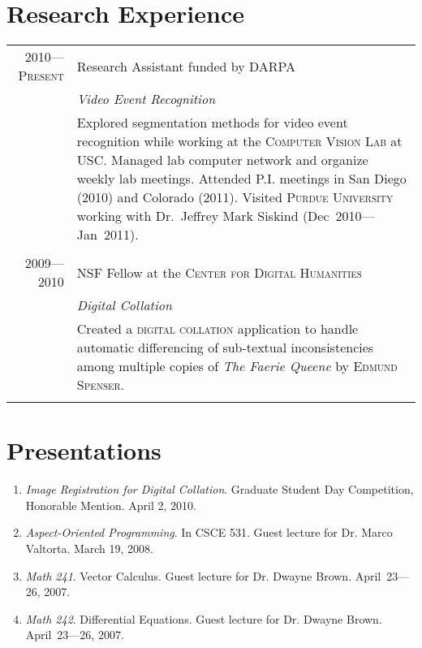 \documentclass[a4paper,10pt]{article}
\begin{document}
\section{Research Experience}
\begin{tabular}{r|p{11cm}}
\textsc{2010---Present}
& Research Assistant funded by \textsc{DARPA} \\
&\emph{Video Event Recognition}\\
&\footnotesize{Explored segmentation methods for video event recognition while working at the \textsc{Computer Vision Lab} at \textsc{USC}. Managed lab computer network and organize weekly lab meetings.  Attended P.I. meetings in San Diego (2010) and Colorado (2011). Visited \textsc{Purdue University} working with Dr.~Jeffrey Mark Siskind (Dec~2010---Jan~2011).}
\\\multicolumn{2}{c}{} \\
\textsc{2009---2010}
& NSF Fellow at the \textsc{Center for Digital Humanities} \\
&\emph{Digital Collation}\\
&\footnotesize{Created a \textsc{digital collation} application to handle automatic differencing of sub-textual inconsistencies among multiple copies of \emph{The Faerie Queene} by \textsc{Edmund Spenser}.}
\\\multicolumn{2}{c}{} \\
\end{tabular}


\nocite{temlyakov2010}
\nocite{zhang2010}
\renewcommand\refname{Publications}




\section{Presentations}
\begin{enumerate}
\renewcommand{\labelenumi}{[P\arabic{enumi}] }
\item \emph{Image Registration for Digital Collation}. Graduate Student Day Competition, Honorable Mention. April 2, 2010.
\item \emph{Aspect-Oriented Programming}. In CSCE 531. Guest lecture for Dr. Marco Valtorta. March 19, 2008.
\item \emph{Math 241}. Vector Calculus. Guest lecture for Dr. Dwayne Brown. April~23---26, 2007. 
\item \emph{Math 242}. Differential Equations. Guest lecture for Dr. Dwayne Brown. April~23---26, 2007. 
\end{enumerate}
\end{document}
